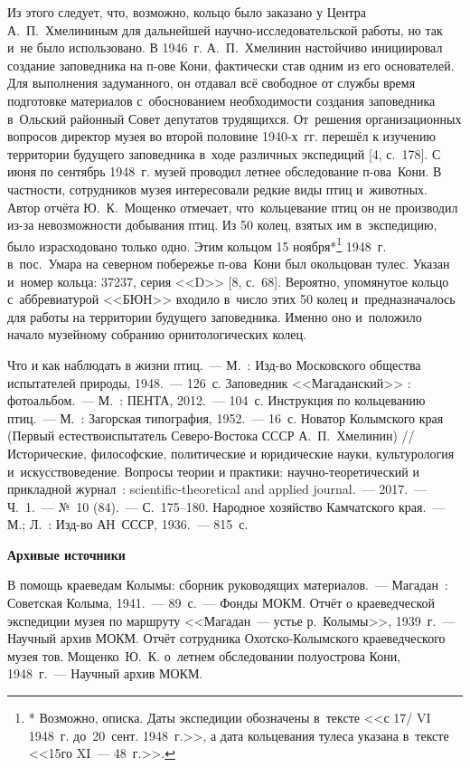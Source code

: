 Из этого следует, что, возможно, кольцо было заказано у Центра А.~П.~Хмелининым для дальнейшей научно-исследовательской работы, но так и~не было использовано. В 1946~г. А.~П.~Хмелинин настойчиво инициировал создание заповедника на п-ове Кони, фактически став одним из его основателей. Для выполнения задуманного, он отдавал всё свободное от службы время подготовке материалов с~обоснованием необходимости создания заповедника в~Ольский районный Совет депутатов трудящихся. От~решения организационных вопросов директор музея во второй половине 1940-х~гг. перешёл к изучению территории будущего заповедника в~ходе различных экспедиций [4, с.~178]. С июня по сентябрь 1948~г. музей проводил летнее обследование п-ова~Кони. В частности, сотрудников музея интересовали редкие виды птиц и~животных. Автор отчёта Ю.~К.~Мощенко отмечает, что~кольцевание птиц он не производил из-за невозможности добывания птиц. Из 50 колец, взятых им в~экспедицию, было израсходовано только одно. Этим кольцом 15 ноября*\footnote{* Возможно, описка.  Даты экспедиции обозначены в~тексте <<с 17/ VI 1948~г. до~20~сент. 1948~г.>>, а дата кольцевания тулеса указана в~тексте <<15го XI~--- 48~г.>>.} 1948~г. в~пос.~Умара на северном побережье п-ова~Кони был окольцован тулес. Указан и~номер кольца: 37237, серия <<D>> [8, с.~68]. Вероятно, упомянутое кольцо с~аббревиатурой <<БЮН>> входило в~число этих 50 колец и~предназначалось для работы на территории будущего заповедника. Именно оно и~положило начало музейному собранию орнитологических колец.

\begin{thebibliography}{99}

\bibitem{} Что и как наблюдать в жизни птиц.~--- М.~: Изд-во Московского общества испытателей природы, 1948.~--- 126~с.
\bibitem{}Заповедник <<Магаданский>> : фотоальбом.~--- М.~: ПЕНТА, 2012.~--- 104~с.
\bibitem{}Инструкция по кольцеванию птиц.~--- М.~: Загорская типография, 1952.~--- 16~с.
\bibitem{}Новатор Колымского края (Первый естествоиспытатель Северо-Востока СССР А.~П.~Хмелинин) // Исторические, философские, политические и юридические науки, культурология и~искусствоведение. Вопросы теории и практики: научно-теоретический и прикладной журнал~: scientific-theoretical and applied journal.~--- 2017.~--- Ч.~1.~--- №~10 (84).~--- С.~175--180.
\bibitem{} Народное хозяйство Камчатского края.~--- М.; Л.~: Изд-во АН~СССР, 1936.~--- 815~с.

\textbf{Архивые источники}

\bibitem{}В помощь краеведам Колымы: сборник руководящих материалов.~--- Магадан~: Советская Колыма, 1941.~--- 89~с.~--- Фонды МОКМ.
\bibitem{}Отчёт о краеведческой экспедиции музея по маршруту <<Магадан~--- устье р.~Колымы>>, 1939~г.~--- Научный архив МОКМ.
\bibitem{}Отчёт сотрудника Охотско-Колымского краеведческого музея тов. Мощенко~Ю.~К. о~летнем обследовании полуострова Кони, 1948~г.~--- Научный архив МОКМ.


\end{thebibliography}
